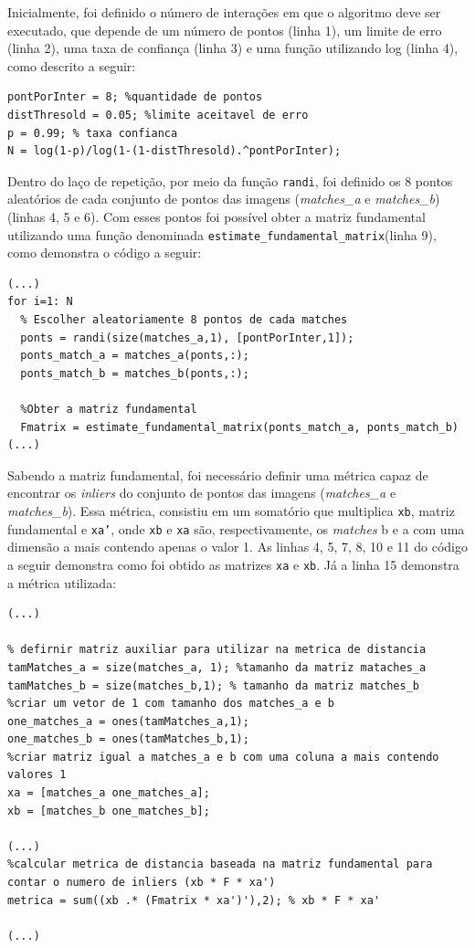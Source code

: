 Inicialmente, foi definido o número de interações em que o algoritmo deve ser executado, que depende de um número de pontos (linha 1), um limite de erro (linha 2), uma taxa de confiança (linha 3) e uma função utilizando log (linha 4), como descrito a seguir:

\begin{lstlisting}[style=Matlab-editor]
pontPorInter = 8; %quantidade de pontos
distThresold = 0.05; %limite aceitavel de erro 
p = 0.99; % taxa confianca
N = log(1-p)/log(1-(1-distThresold).^pontPorInter);
\end{lstlisting}

Dentro do laço de repetição, por meio da função \texttt{randi}, foi definido os 8 pontos aleatórios de cada conjunto de pontos das imagens (\textit{matches\_a} e \textit{matches\_b}) (linhas 4, 5 e 6). Com esses pontos foi possível obter a matriz fundamental utilizando uma função denominada \texttt{estimate\_fundamental\_matrix}(linha 9), como demonstra o código a seguir:

\begin{lstlisting}[style=Matlab-editor]
(...)
for i=1: N
  % Escolher aleatoriamente 8 pontos de cada matches
  ponts = randi(size(matches_a,1), [pontPorInter,1]);
  ponts_match_a = matches_a(ponts,:);
  ponts_match_b = matches_b(ponts,:);

  %Obter a matriz fundamental
  Fmatrix = estimate_fundamental_matrix(ponts_match_a, ponts_match_b)
(...)
\end{lstlisting}

Sabendo a matriz fundamental, foi necessário definir uma métrica capaz de encontrar os \textit{inliers} do conjunto de pontos das imagens (\textit{matches\_a} e \textit{matches\_b}). Essa métrica, consistiu em um somatório que multiplica \texttt{xb}, matriz fundamental e \texttt{xa'}, onde \texttt{xb} e \texttt{xa} são, respectivamente, os \textit{matches} b e a com uma dimensão a mais contendo apenas o valor 1. As linhas 4, 5, 7, 8, 10 e 11 do código a seguir demonstra como foi obtido as matrizes \texttt{xa} e \texttt{xb}. Já a linha 15 demonstra a métrica utilizada:

\begin{lstlisting}[style=Matlab-editor]
(...)

% defirnir matriz auxiliar para utilizar na metrica de distancia
tamMatches_a = size(matches_a, 1); %tamanho da matriz mataches_a
tamMatches_b = size(matches_b,1); % tamanho da matriz matches_b
%criar um vetor de 1 com tamanho dos matches_a e b
one_matches_a = ones(tamMatches_a,1);
one_matches_b = ones(tamMatches_b,1);
%criar matriz igual a matches_a e b com uma coluna a mais contendo valores 1
xa = [matches_a one_matches_a];
xb = [matches_b one_matches_b];

(...)
%calcular metrica de distancia baseada na matriz fundamental para contar o numero de inliers (xb * F * xa')
metrica = sum((xb .* (Fmatrix * xa')'),2); % xb * F * xa'

(...)  
\end{lstlisting}

